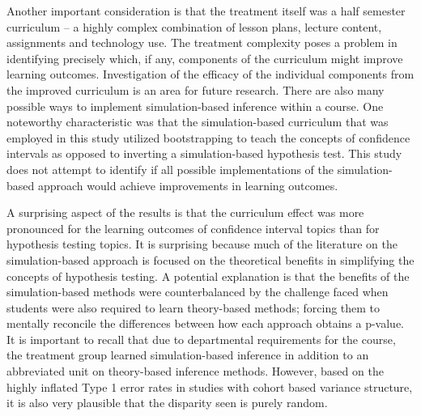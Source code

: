 \documentclass[11pt]{isuthesis}\usepackage[]{graphicx}\usepackage[]{color}
\newcommand{\km}[1]{{\color{red} #1}}
\begin{document}
\km{Another important consideration is that the treatment itself was a half semester curriculum -- a highly complex combination of lesson plans, lecture content, assignments and technology use. The treatment complexity poses a problem in identifying precisely which, if any, components of the curriculum might improve learning outcomes. Investigation of the efficacy of the individual components from the improved curriculum is an area for future research. 
There are also many possible ways to implement simulation-based inference within a course. One noteworthy characteristic was that the simulation-based curriculum that was employed in this study utilized bootstrapping to teach the concepts of confidence intervals as opposed to inverting a simulation-based hypothesis test. This study does not attempt to identify if all possible implementations of the simulation-based approach would achieve improvements in learning outcomes. }

\km{A surprising aspect of the results is that the curriculum effect was more pronounced for the learning outcomes of confidence interval topics than for hypothesis testing topics. It is surprising because much of the literature on the simulation-based approach is focused on the theoretical benefits in simplifying the concepts of hypothesis testing. A potential explanation is that the benefits of the simulation-based methods were counterbalanced by the challenge faced when students were also required to learn theory-based methods; forcing them to mentally reconcile the differences between how each approach obtains a p-value. It is important to recall that due to departmental requirements for the course, the treatment group learned simulation-based inference in addition to an abbreviated unit on theory-based inference methods. However, based on the highly inflated Type 1 error rates in studies with cohort based variance structure, it is also very plausible that the disparity seen is purely random. }

\end{document}
